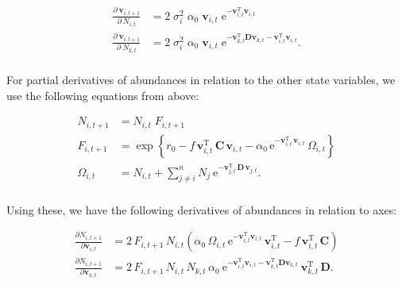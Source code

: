 \begin{equation*}
\begin{split}
    \frac{ \partial \: \mathbf{v}_{i,t+1} }{ \partial \: N_{i,t} } &=
        2 \; \sigma_i^2 \; \alpha_0 \; \mathbf{v}_{i,t} \;
        \textrm{e}^{ - \mathbf{v}_{i,t}^{\textrm{T}} \mathbf{v}_{i,t} } \\
    \frac{ \partial \: \mathbf{v}_{i,t+1} }{ \partial \: N_{k,t} } &=
        2 \; \sigma_i^2 \; \alpha_0 \; \mathbf{v}_{i,t} \;
        \textrm{e}^{ - \mathbf{v}_{k,t}^{\textrm{T}} \mathbf{D} \mathbf{v}_{k,t}
            - \mathbf{v}_{i,t}^{\textrm{T}} \mathbf{v}_{i,t} }
    \textrm{.} \\
\end{split}
\end{equation*}




For partial derivatives of abundances in relation to the other state variables,
we use the following equations from above:


\begin{equation*}
\begin{split}
    N_{i,t+1} &= N_{i,t} \; F_{i,t+1} \\
    F_{i,t+1} &=  \exp \left\{
        r_0 - f \, \mathbf{v}_{i,t}^{\text{T}} \, \mathbf{C} \, \mathbf{v}_{i,t} - 
        \alpha_0 \, \text{e}^{-\mathbf{v}_{i,t}^{\text{T}} \, \mathbf{v}_{i,t}} \,
        \Omega_{i,t}
    \right\} \\
    \Omega_{i,t} &= N_{i,t} + \sum_{j \ne i}^{n}{ N_j \:
        \text{e}^{- \mathbf{v}_{j,t}^{\text{T}} \, \mathbf{D} \, \mathbf{v}_{j,t} } }
    \textrm{.} \\
\end{split}
\end{equation*}



Using these, we have the following derivatives of abundances in relation
to axes:

\begin{equation*}
\begin{split}
    \frac{ \partial N_{i,t+1} }{ \partial \mathbf{v}_{i,t} } &= 
        2 \, F_{i,t+1} \,  N_{i,t}
        \left(
            \alpha_0 \, \Omega_{i,t} \, \text{e}^{ -\mathbf{v}_{i,t}^{\text{T}}
            \mathbf{v}_{i,t} } \, \mathbf{v}_{i,t}^{\text{T}}
            - f \, \mathbf{v}_{i,t}^{\text{T}} \, \mathbf{C}
        \right) \\
    \frac{ \partial N_{i,t+1} }{ \partial \mathbf{v}_{k,t} } &= 
        2 \, F_{i,t+1} \, N_{i,t} \, N_{k,t} \, \alpha_0 \: 
        \text{e}^{ -\mathbf{v}_{i,t}^{\text{T}} \mathbf{v}_{i,t} -
            \mathbf{v}_{k,t}^{\text{T}} \mathbf{D} \mathbf{v}_{k,t} } \:
        \mathbf{v}_{k,t}^{\text{T}} \, \mathbf{D}
    \textrm{.}
\end{split}
\end{equation*}


